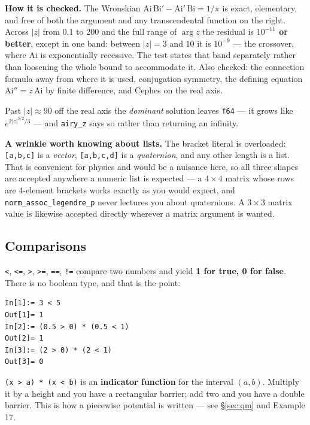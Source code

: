 \documentclass[11pt]{article}
\newcommand{\code}[1]{\texttt{#1}}
\begin{document}
\textbf{How it is checked.} The Wronskian
$\mathrm{Ai}\,\mathrm{Bi}' - \mathrm{Ai}'\,\mathrm{Bi} = 1/\pi$ is
exact, elementary, and free of both the argument and any transcendental
function on the right. Across $|z|$ from 0.1 to 200 and the full range
of $\arg z$ the residual is \textbf{$10^{-11}$ or better}, except in one
band: between $|z| = 3$ and $10$ it is
$10^{-9}$ --- the crossover, where $\mathrm{Ai}$ is exponentially
recessive. The test states that band separately rather than loosening
the whole bound to accommodate it. Also checked: the connection
formula away from where it is used, conjugation symmetry, the defining
equation $\mathrm{Ai}'' = z\,\mathrm{Ai}$ by finite difference, and
Cephes on the real axis.

Past $|z|\approx 90$ off the real axis the \emph{dominant} solution
leaves \code{f64} --- it grows like $e^{2|z|^{3/2}/3}$ --- and
\code{airy\_z} says so rather than returning an infinity.

\textbf{A wrinkle worth knowing about lists.} The bracket literal is
overloaded: \code{[a,b,c]} is a \emph{vector}, \code{[a,b,c,d]} is a
\emph{quaternion}, and any other length is a list. That is convenient
for physics and would be a nuisance here, so all three shapes are
accepted anywhere a numeric list is expected --- a $4\times4$ matrix
whose rows are 4-element brackets works exactly as you would expect, and
\code{norm\_assoc\_legendre\_p} never lectures you about quaternions. A
$3\times3$ matrix value is likewise accepted directly wherever a matrix
argument is wanted.

\subsection{Comparisons}\label{sec:cmp}

\code{<}, \code{<=}, \code{>}, \code{>=}, \code{==}, \code{!=} compare
two numbers and yield \textbf{1 for true, 0 for false}. There is no
boolean type, and that is the point:

\begin{lstlisting}
In[1]:= 3 < 5
Out[1]= 1
In[2]:= (0.5 > 0) * (0.5 < 1)
Out[2]= 1
In[3]:= (2 > 0) * (2 < 1)
Out[3]= 0
\end{lstlisting}

\code{(x > a) * (x < b)} is an \textbf{indicator function} for the
interval $(a,b)$. Multiply it by a height and you have a rectangular
barrier; add two and you have a double barrier. This is how a piecewise
potential is written --- see \S\ref{sec:qm} and Example 17.
\end{document}
